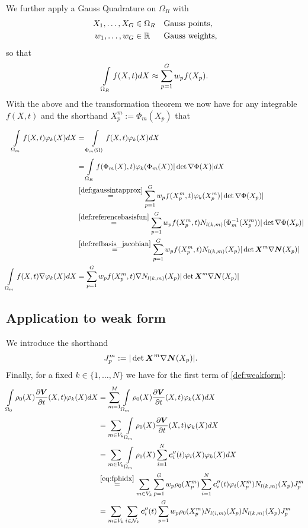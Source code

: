 \documentclass[a4paper,12pt]{article}
\newcommand{\Nk}{\mathcal{N}_k}
\newcommand{\Or}{\Omega_0}
\newcommand{\Om}{\Omega_R}
\newcommand{\intor}{\intl{\Or}{}}
\newcommand{\intom}{\intl{\Om}{}}
\newcommand{\sumnk}{\suml{i\in{\Nk}}{}}
\newcommand{\sumgp}{\suml{p=1}{G}}
\newcommand{\jmp}{J^m_p}
\newcommand{\re}[1]{\stackrel{\eqref{#1}}{=}}
\newcommand{\sumvk}{\suml{m\in V_k}{}}
\newcommand{\pmp}{X^m_p}%
\begin{document}
We further apply a Gauss Quadrature on $\Om$ with
\begin{align}
	X_1,\ldots,X_G  &\in \Om &&\text{Gauss points},\\
	w_1,\ldots,w_G  &\in \R &&\text{Gauss weights},
\end{align}
so that
\begin{align}
	\intom f(X,t)dX \approx \sumgp w_pf(X_p).\label{def:gaussintapprox}
\end{align}
With the above and the transformation theorem we now have for any integrable $f(X,t)$ and the shorthand $\pmp := \Phi_m(X_p)$ that
\begin{align}
	\intl{\Omega_m}{}f(X,t)\varphi_k(X)dX &= \intl{\Phi_m(\Omega)}{}f(X,t)\varphi_k(X)dX\label{eq:fphidx}\\
	& = \intl{\Om}{}f(\Phi_m(X),t)\varphi_k(\Phi_m(X))|\det \nabla\Phi(X)|dX\nonumber\\
	& \re{def:gaussintapprox} \sumgp w_pf(\pmp,t)\varphi_k(\pmp)|\det \nabla\Phi(X_p)|\nonumber\\
	& \re{def:referencebasisfun} \sumgp w_pf(\pmp,t)N_{l(k,m)}(\Phi_m^{-1}(\pmp))|\det \nabla\Phi(X_p)|\nonumber\\
	& \re{def:refbasis_jacobian} \sumgp w_pf(\pmp,t)N_{l(k,m)}(X_p)|\det \vX^m\nabla\vN(X_p)|\nonumber\\
	\intl{\Omega_m}{}f(X,t)\nabla\varphi_k(X)dX &= \sumgp w_pf(\pmp,t)\nabla N_{l(k,m)}(X_p)|\det \vX^m\nabla\vN(X_p)|\label{eq:fgradphidx}
\end{align}

\subsection{Application to weak form}
We introduce the shorthand
\begin{align}
	\jmp &:= |\det \vX^m\nabla\vN(X_p)|.\label{def:jacshorthand}
\end{align}
Finally, for a fixed $k\in\{1,\ldots, N\}$ we have for the first term of \eqref{def:weakform}:
\begin{align*}
	\intor \rho_0(X)\d{\vV}{t}(X,t)\varphi_k(X)dX
		&= \suml{m=1}{M}\intl{\Omega_m}{} \rho_0(X)\d{\vV}{t}(X,t)\varphi_k(X)dX\\
		&= \sumvk\intl{\Omega_m}{} \rho_0(X)\d{\vV}{t}(X,t)\varphi_k(X)dX\\  		
		&= \sumvk\intl{\Omega_m}{} \rho_0(X)\sumi \vc_i''(t)\varphi_i(X)\varphi_k(X)dX\\
		&\re{eq:fphidx} \sumvk\sumgp w_p \rho_0(\pmp)\sumi \vc_i''(t)\varphi_i(\pmp) N_{l(k,m)}(X_p)\jmp\\
		&= \sumvk\sumnk \vc_i''(t)\sumgp w_p \rho_0(\pmp)N_{l(i,m)}(X_p) N_{l(k,m)}(X_p)\jmp
\end{align*}
\end{document}
